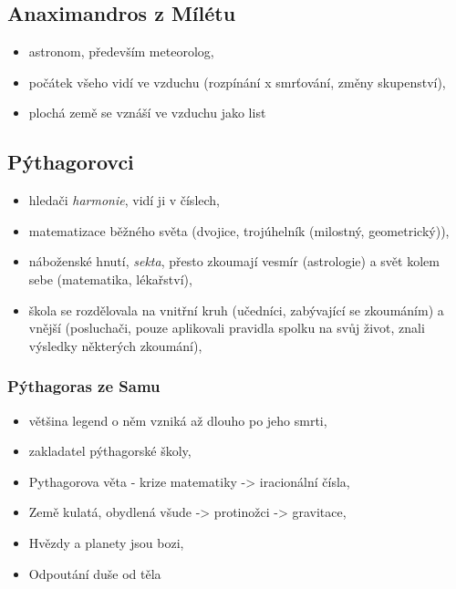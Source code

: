 \documentclass[11pt,a4paper,czech]{article}
\begin{document}
\subsection{Anaximandros z Mílétu}

\begin{itemize}
    \item astronom, především meteorolog,
    \item počátek všeho vidí ve vzduchu (rozpínání x smrťování, změny skupenství),
    \item plochá země se vznáší ve vzduchu jako list
\end{itemize}

\subsection{Pýthagorovci}

    \begin{itemize}
        \item hledači \textit{harmonie}, vidí ji v číslech,
        \item matematizace běžného světa (dvojice, trojúhelník (milostný, geometrický)),
        \item náboženské hnutí, \textit{sekta}, přesto zkoumají vesmír (astrologie) a svět kolem sebe (matematika, lékařství),
        \item škola se rozdělovala na vnitřní kruh (učedníci, zabývající se zkoumáním) a vnější (posluchači, pouze aplikovali pravidla spolku na svůj život, znali výsledky některých zkoumání),
    \end{itemize}

    \subsubsection{Pýthagoras ze Samu}

    \begin{itemize}
        \item většina legend o něm vzniká až dlouho po jeho smrti,
        \item zakladatel pýthagorské školy,
        \item Pythagorova věta - krize matematiky -> iracionální čísla,
        \item Země kulatá, obydlená všude -> protinožci -> gravitace,
        \item Hvězdy a planety jsou bozi,
        \item Odpoutání duše od těla
    \end{itemize}
\end{document}
